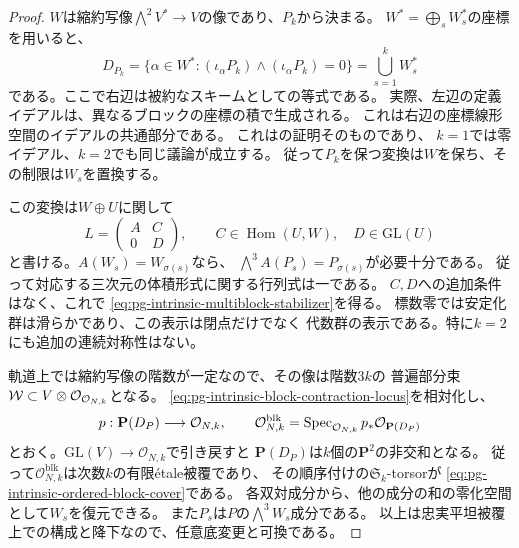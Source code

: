 \begin{proof}
$W$は縮約写像$\bigwedge^2V^*\to V$の像であり、$P_k$から決まる。
$W^*=\bigoplus_sW_s^*$の座標を用いると、
\begin{equation}
 D_{P_k}
  =\{\alpha\in W^*:(\iota_\alpha P_k)\wedge
                    (\iota_\alpha P_k)=0\}
  =\bigcup_{s=1}^kW_s^*
 \label{eq:pg-intrinsic-block-contraction-locus}
\end{equation}
である。ここで右辺は被約なスキームとしての等式である。
実際、左辺の定義イデアルは、異なるブロックの座標の積で生成される。
これは右辺の座標線形空間のイデアルの共通部分である。
これは\cite[縮約二形式による復元補題]{PoissonCubic}の証明そのものであり、
$k=1$では零イデアル、$k=2$でも同じ議論が成立する。
従って$P_k$を保つ変換は$W$を保ち、その制限は$W_s$を置換する。

この変換は$W\oplus U$に関して
\begin{equation}
 L=\begin{pmatrix}A&C\\0&D\end{pmatrix},\qquad
 C\in\operatorname{Hom}(U,W),\quad D\in\mathrm{GL}(U)
 \label{eq:pg-intrinsic-block-stabilizer-matrix}
\end{equation}
と書ける。$A(W_s)=W_{\sigma(s)}$なら、
$\bigwedge^3A(P_s)=P_{\sigma(s)}$が必要十分である。
従って対応する三次元の体積形式に関する行列式は一である。
$C,D$への追加条件はなく、これで
\eqref{eq:pg-intrinsic-multiblock-stabilizer}を得る。
標数零では安定化群は滑らかであり、この表示は閉点だけでなく
代数群の表示である。特に$k=2$にも追加の連続対称性はない。

軌道上では縮約写像の階数が一定なので、その像は階数$3k$の
普遍部分束$\mathcal W\subset V\otimes\mathcal O_{\mathcal O_{N,k}}$となる。
\eqref{eq:pg-intrinsic-block-contraction-locus}を相対化し、
\begin{equation}
 p:\mathbf P(D_P)\longrightarrow\mathcal O_{N,k},\qquad
 \mathcal O_{N,k}^{\mathrm{blk}}
   =\operatorname{Spec}_{\mathcal O_{N,k}}p_*\mathcal O_{\mathbf P(D_P)}
 \label{eq:pg-intrinsic-unordered-block-cover}
\end{equation}
とおく。$\mathrm{GL}(V)\to\mathcal O_{N,k}$で引き戻すと
$\mathbf P(D_P)$は$k$個の$\mathbf P^2$の非交和となる。
従って$\mathcal O_{N,k}^{\mathrm{blk}}$は次数$k$の有限\'etale被覆であり、
その順序付けの$\mathfrak S_k$-torsorが
\eqref{eq:pg-intrinsic-ordered-block-cover}である。
各双対成分から、他の成分の和の零化空間として$W_s$を復元できる。
また$P_s$は$P$の$\bigwedge^3W_s$成分である。
以上は忠実平坦被覆上での構成と降下なので、任意底変更と可換である。
\end{proof}


